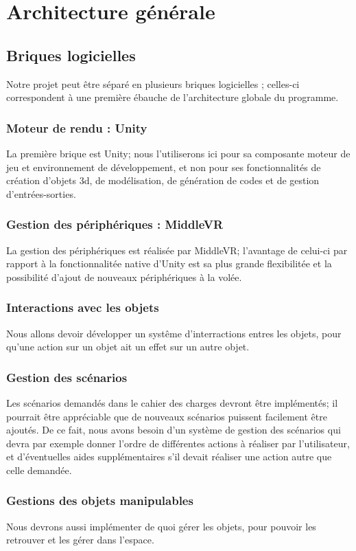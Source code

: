 \section{Architecture générale}
	\subsection{Briques logicielles}
		Notre projet peut être séparé en plusieurs briques logicielles ; celles-ci correspondent à une première ébauche de l'architecture globale du programme.
		\subsubsection{Moteur de rendu : Unity}
			La première brique est Unity; nous l'utiliserons ici pour sa composante moteur de jeu et environnement de développement, et non pour ses fonctionnalités de création d'objets 3d, de modélisation, de génération de codes et de gestion d'entrées-sorties.		
		\subsubsection{Gestion des périphériques : MiddleVR}
			La gestion des périphériques est réalisée par MiddleVR; l'avantage de celui-ci par rapport à la fonctionnalitée native d'Unity est sa plus grande flexibilitée et la possibilité d'ajout de nouveaux périphériques à la volée.
		\subsubsection{Interactions avec les objets}
			Nous allons devoir développer un systême d'interractions entres les objets, pour qu'une action sur un objet ait un effet sur un autre objet.
		\subsubsection{Gestion des scénarios}
			Les scénarios demandés dans le cahier des charges devront être implémentés; il pourrait être appréciable que de nouveaux scénarios puissent facilement être ajoutés.
			De ce fait, nous avons besoin d'un système de gestion des scénarios qui devra par exemple donner l'ordre de différentes actions à réaliser par l'utilisateur, et d'éventuelles aides supplémentaires s'il devait réaliser une action autre que celle demandée.
		\subsubsection{Gestions des objets manipulables}
			Nous devrons aussi implémenter de quoi gérer les objets, pour pouvoir les retrouver et les gérer dans l'espace.
